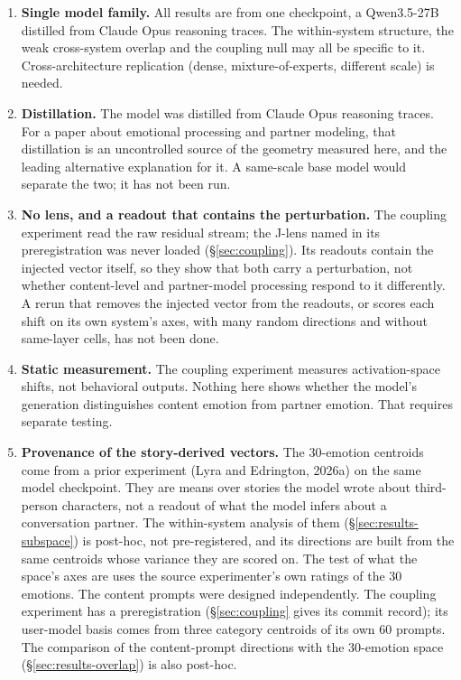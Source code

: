 \documentclass[11pt,a4paper]{article}
\begin{document}
\begin{enumerate}
  \item \textbf{Single model family.} All results are from one checkpoint, a Qwen3.5-27B distilled from Claude Opus reasoning traces. The within-system structure, the weak cross-system overlap and the coupling null may all be specific to it. Cross-architecture replication (dense, mixture-of-experts, different scale) is needed.

  \item \textbf{Distillation.} The model was distilled from Claude Opus reasoning traces. For a paper about emotional processing and partner modeling, that distillation is an uncontrolled source of the geometry measured here, and the leading alternative explanation for it. A same-scale base model would separate the two; it has not been run.

  \item \textbf{No lens, and a readout that contains the perturbation.} The coupling experiment read the raw residual stream; the J-lens named in its preregistration was never loaded (\S\ref{sec:coupling}). Its readouts contain the injected vector itself, so they show that both carry a perturbation, not whether content-level and partner-model processing respond to it differently. A rerun that removes the injected vector from the readouts, or scores each shift on its own system's axes, with many random directions and without same-layer cells, has not been done.

  \item \textbf{Static measurement.} The coupling experiment measures activation-space shifts, not behavioral outputs. Nothing here shows whether the model's generation distinguishes content emotion from partner emotion. That requires separate testing.

  \item \textbf{Provenance of the story-derived vectors.} The 30-emotion centroids come from a prior experiment (Lyra and Edrington, 2026a) on the same model checkpoint. They are means over stories the model wrote about third-person characters, not a readout of what the model infers about a conversation partner. The within-system analysis of them (\S\ref{sec:results-subspace}) is post-hoc, not pre-registered, and its directions are built from the same centroids whose variance they are scored on. The test of what the space's axes are uses the source experimenter's own ratings of the 30 emotions. The content prompts were designed independently. The coupling experiment has a preregistration (\S\ref{sec:coupling} gives its commit record); its user-model basis comes from three category centroids of its own 60 prompts. The comparison of the content-prompt directions with the 30-emotion space (\S\ref{sec:results-overlap}) is also post-hoc.
\end{enumerate}
\end{document}
